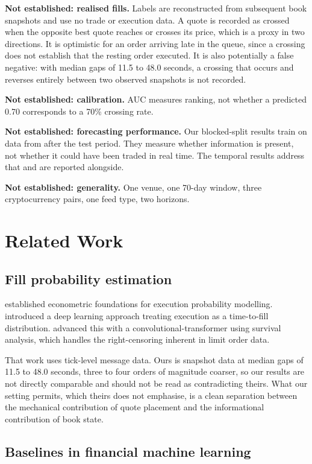 \documentclass[11pt]{article}
\begin{document}
\textbf{Not established: realised fills.} Labels are reconstructed from
subsequent book snapshots and use no trade or execution data. A quote is
recorded as crossed when the opposite best quote reaches or crosses its price,
which is a proxy in two directions. It is optimistic for an order arriving late
in the queue, since a crossing does not establish that the resting order
executed. It is also potentially a false negative: with median gaps of 11.5 to
48.0 seconds, a crossing that occurs and reverses entirely between two observed
snapshots is not recorded.

\textbf{Not established: calibration.} AUC measures ranking, not whether a
predicted 0.70 corresponds to a 70\% crossing rate.

\textbf{Not established: forecasting performance.} Our blocked-split results
train on data from after the test period. They measure whether information is
present, not whether it could have been traded in real time. The temporal
results address that and are reported alongside.

\textbf{Not established: generality.} One venue, one 70-day window, three
cryptocurrency pairs, one feed type, two horizons.

\section{Related Work}

\subsection{Fill probability estimation}

\citet{lo2002} established econometric foundations for execution probability
modelling. \citet{maglaras2022} introduced a deep learning approach treating
execution as a time-to-fill distribution. \citet{arroyo2024} advanced this with
a convolutional-transformer using survival analysis, which handles the
right-censoring inherent in limit order data.

That work uses tick-level message data. Ours is snapshot data at median gaps of
11.5 to 48.0 seconds, three to four orders of magnitude coarser, so our results
are not directly comparable and should not be read as contradicting theirs.
What our setting permits, which theirs does not emphasise, is a clean
separation between the mechanical contribution of quote placement and the
informational contribution of book state.

\subsection{Baselines in financial machine learning}
\end{document}
